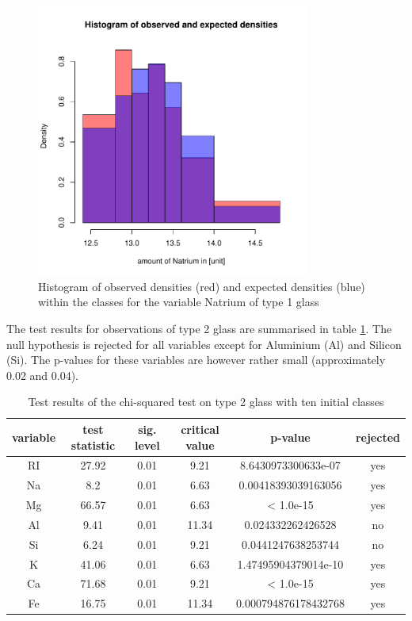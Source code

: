 \documentclass[a4paper, 12pt, titlepage, headsepline, listof = totoc, bibliography = totoc, numbers = noenddot]{scrartcl}
\begin{document}
\begin{figure}[h!]
\centering
\includegraphics[width=0.8\textwidth]{report-chisqType1Na}
\caption{Histogram of observed densities (red) and expected densities (blue) within the classes for the variable Natrium of type 1 glass}
\label{fig:chisqType1Na}
\end{figure}

The test results for observations of type 2 glass are summarised in table \ref{tab:chi-type2}. The null hypothesis is rejected for all variables except for Aluminium (Al) and Silicon (Si). The p-values for these variables are however rather small (approximately 0.02 and 0.04).

\begin{table}[h]
\centering
\begin{tabular}{|cccccc|} \hline variable & test statistic & sig. level & critical value & p-value & rejected\\ \hline RI & 27.92 & 0.01 & 9.21 & 8.6430973300633e-07 & yes\\ 
Na & 8.2 & 0.01 & 6.63 & 0.00418393039163056 & yes\\ 
Mg & 66.57 & 0.01 & 6.63 & < 1.0e-15 & yes\\ 
Al & 9.41 & 0.01 & 11.34 & 0.024332262426528 & no\\ 
Si & 6.24 & 0.01 & 9.21 & 0.0441247638253744 & no\\ 
K & 41.06 & 0.01 & 6.63 & 1.47495904379014e-10 & yes\\ 
Ca & 71.68 & 0.01 & 9.21 & < 1.0e-15 & yes\\ 
Fe & 16.75 & 0.01 & 11.34 & 0.000794876178432768 & yes\\ \hline \end{tabular}\caption{Test results of the chi-squared test on type 2 glass with ten initial classes}
\label{tab:chi-type2}
\end{table}
\end{document}
